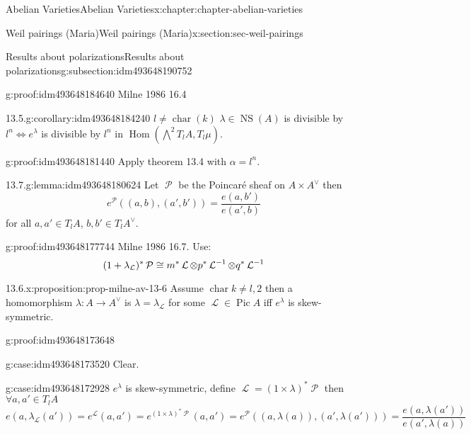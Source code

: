 \documentclass[oneside,10pt,]{book}
\newcommand{\qedhere}{\relax}
\numberwithin{equation}{section}
\newcommand{\sheaf}[1]{\operatorname{\mathcal{#1}}}
\DeclareMathOperator{\Hom}{Hom}
\DeclareMathOperator{\Pic}{Pic}
\DeclareMathOperator{\characteristic}{char}
\DeclareMathOperator{\NS}{NS}
\begin{document}
\begin{chapterptx}{Abelian Varieties}{}{Abelian Varieties}{}{}{x:chapter:chapter-abelian-varieties}
\begin{sectionptx}{Weil pairings (Maria)}{}{Weil pairings (Maria)}{}{}{x:section:sec-weil-pairings}
\begin{subsectionptx}{Results about polarizations}{}{Results about polarizations}{}{}{g:subsection:idm493648190752}
\begin{proofptx}{}{g:proof:idm493648184640}
Milne 1986 16.4%
\end{proofptx}
\begin{corollary}{13.5.}{}{g:corollary:idm493648184240}%
\(l \ne \characteristic (k)\) \(\lambda \in \NS(A) \) is divisible by \(l^n \iff e^\lambda\) is divisible by \(l^n\) in \(\Hom (\bigwedge^2 T_lA, T_l \mu)\).%
\end{corollary}
\begin{proofptx}{}{g:proof:idm493648181440}
Apply theorem 13.4 with \(\alpha = l^n\).%
\end{proofptx}
\begin{lemma}{13.7.}{}{g:lemma:idm493648180624}%
Let \(\sheaf P\) be the Poincaré sheaf on \(A\times A^\vee\) then%
\begin{equation*}
e^{\sheaf P} ((a,b),(a',b')) = \frac{e(a,b')}{e(a',b)}
\end{equation*}
for all \(a,a' \in T_l A\), \(b,b' \in T_l A^\vee\).%
\end{lemma}
\begin{proofptx}{}{g:proof:idm493648177744}
Milne 1986 16.7. Use:%
\begin{equation*}
(1+ \lambda_{\sheaf L})^* \sheaf P \cong m^* \sheaf L \otimes p^* \sheaf L^{-1} \otimes q^* \sheaf L^{-1}\qedhere
\end{equation*}
%
\end{proofptx}
\begin{proposition}{13.6.}{}{x:proposition:prop-milne-av-13-6}%
Assume \(\characteristic k \ne l,2\) then a homomorphism \(\lambda\colon A\to A^\vee\) is \(\lambda = \lambda_{\sheaf L}\) for some \(\sheaf L \in \Pic A\) iff \(e^\lambda\) is skew-symmetric.%
\end{proposition}
\begin{proofptx}{}{g:proof:idm493648173648}
\begin{case}{}{}{g:case:idm493648173520}
Clear.%
\end{case}
\begin{case}{}{}{g:case:idm493648172928}
\(e^\lambda\) is skew-symmetric, define \(\sheaf L = (1 \times \lambda)^* \sheaf P\) then  \(\forall a,a' \in T_l A\)%
\begin{equation*}
e(a,\lambda_{\sheaf L} (a') ) = e^{\sheaf L}(a,a') = e^{(1\times \lambda)^* \sheaf P} (a,a') = e^{\sheaf P}((a,\lambda (a)), (a',\lambda(a'))) = \frac{e(a,\lambda (a'))}{ e(a',\lambda(a))}
\end{equation*}
%
\begin{equation*}

\end{equation*}
\end{case}
\end{proofptx}
\end{subsectionptx}
\end{sectionptx}
\end{chapterptx}
\end{document}
